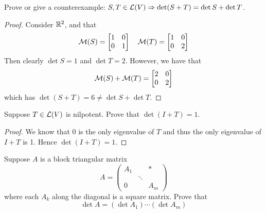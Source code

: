 \documentclass{extarticle}
\begin{document}
\newpage 
{}


\begin{problem}{1}
    Prove or give a counterexample: \(S, T \in \mathcal{L}(V) \Rightarrow \det (S+T) = \det S + \det T\). 
\end{problem}

\begin{proof}
Consider \(\mathbb{R}^2\), and that 
\[\mathcal{M}(S) = \begin{bmatrix}
    1 & 0 \\ 
    0 & 1
\end{bmatrix} \ \ \ \mathcal{M}(T) = \begin{bmatrix}
    1 & 0 \\ 
    0 & 2
\end{bmatrix}\]
Then clearly \(\det S = 1\) and \(\det T = 2\). However, we have that  
\[\mathcal{M}(S) + \mathcal{M}(T) = \begin{bmatrix}
    2 & 0 \\ 
    0 & 2
\end{bmatrix}\]
which has \(\det (S+T) = 6 \neq \det S + \det T\).
\end{proof}


\begin{problem}{3}
    Suppose \(T \in \mathcal{L}(V)\) is nilpotent. Prove that \(\det (I + T) = 1\).
\end{problem}

\begin{proof}
We know that 0 is the only eigenvalue of \(T\) and thus the only eigenvalue of \(I + T\) is 1. Hence 
\(\det (I+T) = 1\).
\end{proof}

\begin{problem}{5}
    Suppose \(A\) is a block triangular matrix 
    \[A = \begin{pmatrix}
        A_1 & & * \\ 
           & \ddots & \\ 
        0 & & A_m
    \end{pmatrix}\]
    where each \(A_k\) along the diagonal is a square matrix. Prove that 
    \[\det A = (\det A_1) \cdots (\det A_m)\]
\end{problem}
\end{document}
